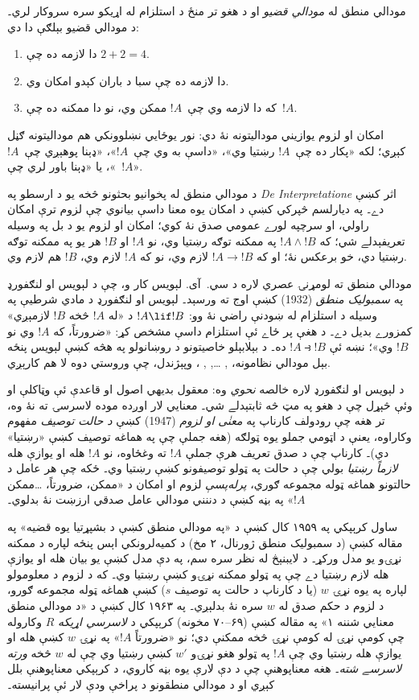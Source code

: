 \documentclass[../../../include/open-logic-section]{subfiles}
\begin{document}


مودالي منطق له \emph{مودالي قضيو} او د هغو تر منځ د استلزام له
اړيکو سره سروکار لري۔ د مودالي قضيو بېلګې دا دي:
\begin{enumerate}
\item دا لازمه ده چې $2+2=4$.
\item دا لازمه ده چې سبا د باران کېدو امکان وي.
\item که دا لازمه وي چې~$!A$ ممکن وي، نو دا ممکنه ده چې~$!A$.
\end{enumerate}
امکان او لزوم يوازيني موداليتونه نۀ دي: نور يوځايي نښلوونکي هم
موداليتونه ګڼل کېږي؛ لکه «پکار ده چې~$!A$ رښتيا وي»، «داسې به وي
چې~$!A$»، «ډېنا پوهېږي چې~$!A$»، يا «ډېنا باور لري چې~$!A$».

د مودالي منطق له پخوانيو بحثونو څخه يو د ارسطو په
\emph{De Interpretatione} اثر کښې دے۔ په ديارلسم څپرکي کښې د امکان
يوه معنا داسې بيانوي چې لزوم ترې امکان راولي، او سرچپه لورے عمومي صدق نۀ کوي؛ امکان او لزوم يو د بل په وسيله تعريفېدلے شي؛ که
$!A \land !B$ په ممکنه توګه رښتيا وي، نو $!A$ او $!B$ هر يو په ممکنه
توګه رښتيا دي، خو برعکس نۀ؛ او که $!A \to !B$ لازم وي، نو که
$!A$ لازم وي، $!B$ هم لازم وي.

مودالي منطق ته لومړنۍ عصري لاره د سي.~آی. لېويس کار و، چې د لېويس
او لنګفورډ په \emph{سمبوليک منطق} (1932) کښې اوج ته ورسېد۔ لېويس او
لنګفورډ د مادي شرطيې په وسيله د استلزام له ښودنې راضي نۀ وو:
$!A \lif !B$ د «له $!A$ څخه $!B$ لازمېږي» کمزورے بديل دے۔ د هغې
پر ځاے ئې استلزام داسې مشخص کړ: «ضرورتاً، که $!A$ وي نو $!B$ وي»؛
نښه ئې $!A \strictif !B$ ده۔ د بېلابېلو خاصيتونو د روښانولو په هڅه
کښې لېويس پنځه بېل مودالي نظامونه، , \ldots, ,
، وپېژندل، چې وروستي دوه لا هم کارېږي.

د لېويس او لنګفورډ لاره خالصه \emph{نحوي} وه: معقول بديهي اصول او
قاعدې ئې وټاکلې او وئې څېړل چې د هغو په مټ څه ثابتېدلے شي۔ معنايي
لار اوږده موده لاسرسۍ ته نۀ وه، تر هغه چې رودولف کارناپ په
\emph{معنٰی او لزوم} (1947) کښې \emph{د حالت توصيف} مفهوم وکاراوه،
يعنې د اټومي جملو يوه ټولګه (هغه جملې چې په هماغه توصيف کښې
«رښتيا» دي)۔ کارناپ چې د صدق تعريف هرې جملې $!A$ ته وغځاوه، نو
$!A$ هله او يوازې هله \emph{لازماً رښتيا} بولي چې د حالت په ټولو
توصيفونو کښې رښتيا وي۔ ځکه چې هر عامل د حالتونو هماغه ټوله مجموعه
ګوري، \emph{پرله‌پسې} لزوم او امکان د «ممکن، ضرورتاً، \ldots ممکن $!A$»
په بڼه کښې د دننني مودالي عامل صدقي ارزښت نۀ بدلوي۔

ساول کرېپکي په ۱۹۵۹ کال کښې د «په مودالي منطق کښې د بشپړتيا
يوه قضيه» په مقاله کښې (د سمبوليک منطق ژورنال، ۲ مخ) د
کميه‌لرونکي اېس پنځه لپاره د ممکنه نړۍو يو مدل ورکړ۔ د لايبنېڅ له نظر سره سم، په دې مدل کښې يو بيان هله
او يوازې هله لازم رښتيا دے چې په ټولو ممکنه نړۍو کښې رښتيا وي۔
که د لزوم د معلومولو لپاره په يوه نړۍ $w$ (يا د کارناپ د حالت په
توصيف $s$) کښې هماغه ټوله مجموعه ګورو، د لزوم د حکم صدق له $w$
سره نۀ بدلېږي۔ په ۱۹۶۳ کال کښې د «د مودالي منطق معنايي شننه ۱»
په مقاله کښې (۶۹–۷۰ مخونه) کرېپکي د \emph{لاسرسي اړيکه} $R$
وکاروله چې کومې نړۍ له کومې نړۍ څخه ممکنې دي؛ نو
«ضرورتاً $!A$» په نړۍ $w$ کښې هله او يوازې هله رښتيا وي چې $!A$
په ټولو هغو نړۍو $w'$ کښې رښتيا وي چې له $w$ څخه \emph{ورته لاسرسے
شته}۔ هغه معناپوهنې چې د دې لارې يوه بڼه کاروي، د کرېپکي معناپوهنې
بلل کېږي او د مودالي منطقونو د پراخې ودې لار ئې پرانيسته۔
\end{document}
